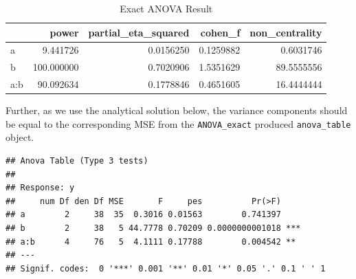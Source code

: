 \documentclass[]{book}
\newenvironment{Shaded}{\begin{snugshade}}{\end{snugshade}}
\newcommand{\NormalTok}[1]{#1}
\newcommand{\OperatorTok}[1]{\textcolor[rgb]{0.81,0.36,0.00}{\textbf{#1}}}
\begin{document}
\begin{table}[!h]

\caption{\label{tab:unnamed-chunk-166}Exact ANOVA Result}
\centering
\begin{tabular}{l|r|r|r|r}
\hline
  & power & partial\_eta\_squared & cohen\_f & non\_centrality\\
\hline
a & 9.441726 & 0.0156250 & 0.1259882 & 0.6031746\\
\hline
b & 100.000000 & 0.7020906 & 1.5351629 & 89.5555556\\
\hline
a:b & 90.092634 & 0.1778846 & 0.4651605 & 16.4444444\\
\hline
\end{tabular}
\end{table}

Further, as we use the analytical solution below, the variance components should be equal to the corresponding MSE from the \texttt{ANOVA\_exact} produced \texttt{anova\_table} object.

\begin{Shaded}
\end{Shaded}

\begin{verbatim}
## Anova Table (Type 3 tests)
## 
## Response: y
##     num Df den Df MSE       F     pes          Pr(>F)    
## a        2     38  35  0.3016 0.01563        0.741397    
## b        2     38   5 44.7778 0.70209 0.0000000001018 ***
## a:b      4     76   5  4.1111 0.17788        0.004542 ** 
## ---
## Signif. codes:  0 '***' 0.001 '**' 0.01 '*' 0.05 '.' 0.1 ' ' 1
\end{verbatim}
\end{document}
